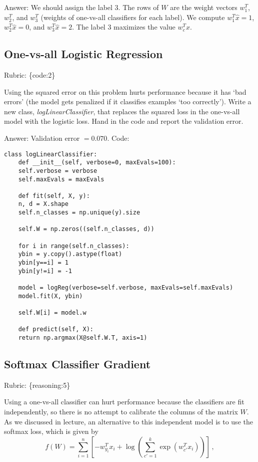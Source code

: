 \documentclass{article}
\def\rubric#1{\gre{Rubric: \{#1\}}}{}
\def\blu#1{{\color{blu}#1}}
\def\gre#1{{\color{gre}#1}}
\def\ans#1{\gre{Answer: #1}}{}
\begin{document}
\ans{We should assign the label 3. The rows of $W$ are the weight vectors $w_1^T$, $w_2^T$, and $w_3^T$ (weights of one-vs-all classifiers for each label). We compute $w_1^T\hat x = 1$, $w_2^T\hat x = 0$, and $w_3^T\hat x = 2$. The label 3 maximizes the value $w_c^T\hat x$.
}



\subsection{One-vs-all Logistic Regression}
\rubric{code:2}

Using the squared error on this problem hurts performance because it has `bad errors' (the model gets penalized if it classifies examples `too correctly').
Write a new class, \emph{logLinearClassifier}, that replaces the squared loss in the one-vs-all model with the logistic loss. \blu{Hand in the code and report the validation error}.

\ans{Validation error $=0.070$. Code:}

\begin{lstlisting}[style=base]
	class logLinearClassifier:
	def __init__(self, verbose=0, maxEvals=100):
	self.verbose = verbose
	self.maxEvals = maxEvals
	
	def fit(self, X, y):
	n, d = X.shape
	self.n_classes = np.unique(y).size
	
	self.W = np.zeros((self.n_classes, d))
	
	for i in range(self.n_classes):
	ybin = y.copy().astype(float)
	ybin[y==i] = 1
	ybin[y!=i] = -1
	
	model = logReg(verbose=self.verbose, maxEvals=self.maxEvals)
	model.fit(X, ybin)
	
	self.W[i] = model.w
	
	def predict(self, X):
	return np.argmax(X@self.W.T, axis=1)	
\end{lstlisting}



\subsection{Softmax Classifier Gradient}
\rubric{reasoning:5}

Using a one-vs-all classifier can hurt performance because the classifiers are fit independently, so there is no attempt to calibrate the columns of the matrix $W$. As we discussed in lecture, an alternative to this independent model is to use the softmax loss, which is given by
\[
f(W) = \sum_{i=1}^n \left[-w_{y_i}^Tx_i + \log\left(\sum_{c' = 1}^k \exp(w_{c'}^Tx_i)\right)\right] \, ,
\]
\end{document}
